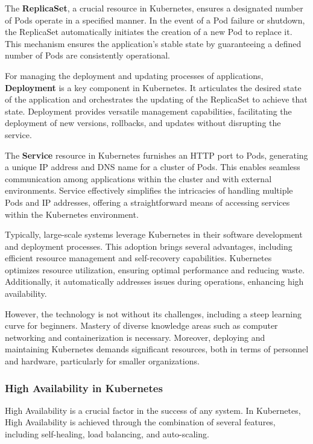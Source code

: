 The \textbf{ReplicaSet}, a crucial resource in Kubernetes, ensures a designated
number of Pods operate in a specified manner. In the event of a Pod failure or
shutdown, the ReplicaSet automatically initiates the creation of a new Pod to
replace it. This mechanism ensures the application's stable state by
guaranteeing a defined number of Pods are consistently operational.

For managing the deployment and updating processes of applications,
\textbf{Deployment} is a key component in Kubernetes. It articulates the desired
state of the application and orchestrates the updating of the ReplicaSet to
achieve that state. Deployment provides versatile management capabilities,
facilitating the deployment of new versions, rollbacks, and updates without
disrupting the service.

The \textbf{Service} resource in Kubernetes furnishes an HTTP port to Pods,
generating a unique IP address and DNS name for a cluster of Pods. This enables
seamless communication among applications within the cluster and with external
environments. Service effectively simplifies the intricacies of handling
multiple Pods and IP addresses, offering a straightforward means of accessing
services within the Kubernetes environment.

Typically, large-scale systems leverage Kubernetes in their software development
and deployment processes. This adoption brings several advantages, including
efficient resource management and self-recovery capabilities. Kubernetes
optimizes resource utilization, ensuring optimal performance and reducing waste.
Additionally, it automatically addresses issues during operations, enhancing
high availability.

However, the technology is not without its challenges, including a steep
learning curve for beginners. Mastery of diverse knowledge areas such as
computer networking and containerization is necessary. Moreover, deploying and
maintaining Kubernetes demands significant resources, both in terms of personnel
and hardware, particularly for smaller organizations.

\subsubsection{High Availability in Kubernetes}

High Availability is a crucial factor in the success of any system. In
Kubernetes, High Availability is achieved through the combination of several
features, including self-healing, load balancing, and auto-scaling.

